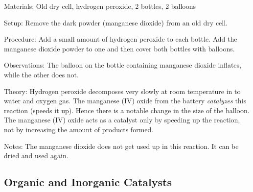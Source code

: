 \begin{multicols}{2}
\begin{description*}
\item[Materials:]{Old dry cell, hydrogen peroxide, 2 bottles, 2 balloons}
\item[Setup:]{Remove the dark powder (manganese dioxide) from an old dry cell.}
\item[Procedure:]{Add a small amount of hydrogen peroxide to each bottle. Add the manganese dioxide powder to one and then cover both bottles with balloons.}
\item[Observations:]{The balloon on the bottle containing manganese dioxide inflates, while the other does not.}
\item[Theory:]{Hydrogen peroxide decomposes very slowly at room temperature in to water and oxygen gas. The manganese (IV) oxide from the battery \emph{catalyzes} this reaction (speeds it up). Hence there is a notable change in the size of the balloon. The manganese (IV) oxide acts as a catalyst only by speeding up the reaction, not by increasing the amount of products formed.}
\item[Notes:]{The manganese dioxide does not get used up in this reaction. It can be dried and used again.}
\end{description*}

\subsection{Organic and Inorganic Catalysts} %



\end{multicols}
